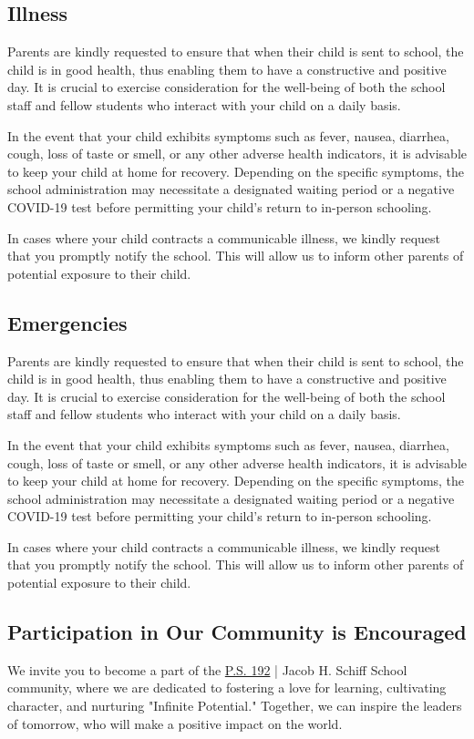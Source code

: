 \documentclass[11pt, letterpaper]{article}
\begin{document}
\subsection{Illness} 
Parents are kindly requested to ensure that when their child is sent to school, the child is in good health, thus enabling them to have a constructive and positive day. It is crucial to exercise consideration for the well-being of both the school staff and fellow students who interact with your child on a daily basis.

In the event that your child exhibits symptoms such as fever, nausea, diarrhea, cough, loss of taste or smell, or any other adverse health indicators, it is advisable to keep your child at home for recovery. Depending on the specific symptoms, the school administration may necessitate a designated waiting period or a negative COVID-19 test before permitting your child's return to in-person schooling.

In cases where your child contracts a communicable illness, we kindly request that you promptly notify the school. This will allow us to inform other parents of potential exposure to their child.

\subsection{Emergencies} 
Parents are kindly requested to ensure that when their child is sent to school, the child is in good health, thus enabling them to have a constructive and positive day. It is crucial to exercise consideration for the well-being of both the school staff and fellow students who interact with your child on a daily basis.

In the event that your child exhibits symptoms such as fever, nausea, diarrhea, cough, loss of taste or smell, or any other adverse health indicators, it is advisable to keep your child at home for recovery. Depending on the specific symptoms, the school administration may necessitate a designated waiting period or a negative COVID-19 test before permitting your child's return to in-person schooling.

In cases where your child contracts a communicable illness, we kindly request that you promptly notify the school. This will allow us to inform other parents of potential exposure to their child.

\subsection{Participation in Our Community is Encouraged}
We invite you to become a part of the \href{https://www.ps192.org}{P.S. 192} |  Jacob H. Schiff School community, where we are dedicated to fostering a love for learning, cultivating character, and nurturing "Infinite Potential." Together, we can inspire the leaders of tomorrow, who will make a positive impact on the world.
\end{document}
